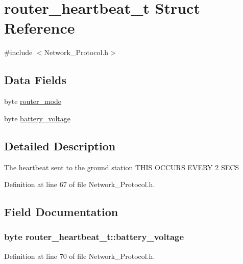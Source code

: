 \hypertarget{structrouter__heartbeat__t}{\section{router\-\_\-heartbeat\-\_\-t Struct Reference}
\label{structrouter__heartbeat__t}
}


{\ttfamily \#include $<$Network\-\_\-\-Protocol.\-h$>$}

\subsection*{Data Fields}
\begin{DoxyCompactItemize}
\item 
byte \hyperlink{structrouter__heartbeat__t_a5c266b86dacfbe3b19ec81becc8b281e}{router\-\_\-mode}
\item 
byte \hyperlink{structrouter__heartbeat__t_a4f4f52834acd1645a9d4d822ad6b5903}{battery\-\_\-voltage}
\end{DoxyCompactItemize}


\subsection{Detailed Description}
The heartbeat sent to the ground station T\-H\-I\-S O\-C\-C\-U\-R\-S E\-V\-E\-R\-Y 2 S\-E\-C\-S 

Definition at line 67 of file Network\-\_\-\-Protocol.\-h.



\subsection{Field Documentation}
\hypertarget{structrouter__heartbeat__t_a4f4f52834acd1645a9d4d822ad6b5903}{
\subsubsection[{battery\-\_\-voltage}]{\setlength{\rightskip}{0pt plus 5cm}byte router\-\_\-heartbeat\-\_\-t\-::battery\-\_\-voltage}}\label{structrouter__heartbeat__t_a4f4f52834acd1645a9d4d822ad6b5903}


Definition at line 70 of file Network\-\_\-\-Protocol.\-h.

